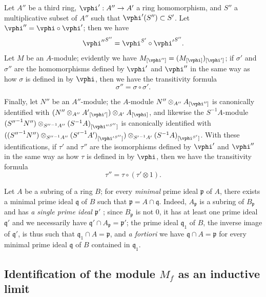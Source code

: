 \begin{env}[1.5.7]
\label{0.1.5.7}
Let $A''$ be a third ring, $\vphi':A''\to A'$ a ring homomorphism, and $S''$ a multiplicative subset of $A''$ such that $\vphi'(S'')\subset S'$.
Let $\vphi''=\vphi\circ\vphi'$; then we have
\[
  {\vphi''}^{S''}=\vphi^{S'}\circ{\vphi'}^{S''}.
\]
Let $M$ be an $A$-module; evidently we have $M_{[\vphi'']}=(M_{[\vphi]})_{[\vphi']}$; if $\sigma'$ and $\sigma''$ are the homomorphisms defined by $\vphi'$ and $\vphi''$ in the same way as how $\sigma$ is defined in  by $\vphi$, then we have the transitivity formula
\[
  \sigma''=\sigma\circ\sigma'.
\]

Finally, let $N''$ be an $A''$-module; the $A$-module $N''\otimes_{A''}A_{[\vphi'']}$ is canonically identified with $(N''\otimes_{A''}{A'}_{[\vphi']})\otimes_{A'}A_{[\vphi]}$, and likewise the $S^{-1}A$-module $({S''}^{-1}N'')\otimes_{{S''}^{-1}A''}(S^{-1}A)_{[{\vphi''}^{S''}]}$ is canonically identified with $(({S''}^{-1}N'')\otimes_{{S''}^{-1}A''}({S'}^{-1}A')_{[{\vphi'}^{S''}]})
  \otimes_{{S'}^{-1}A'}(S^{-1}A)_{[\vphi^{S'}]}$.
With these identifications, if $\tau'$ and $\tau''$ are the isomorphisms defined by $\vphi'$ and $\vphi''$ in the same way as how $\tau$ is defined in  by $\vphi$, then we have the transitivity formula
\[
  \tau''=\tau\circ(\tau'\otimes 1).
\]
\end{env}

\begin{env}[1.5.8]
\label{0.1.5.8}
Let $A$ be a subring of a ring $B$; for every \emph{minimal} prime ideal $\mathfrak{p}$ of $A$, there exists a minimal prime ideal $\mathfrak{q}$ of $B$ such that $\mathfrak{p}=A\cap\mathfrak{q}$.
Indeed, $A_\mathfrak{p}$ is a subring of $B_\mathfrak{p}$  and has \emph{a single prime ideal $\mathfrak{p}'$} ; since $B_\mathfrak{p}$ is not $0$, it has at least one prime ideal $\mathfrak{q}'$ and we necessarily have $\mathfrak{q}'\cap A_\mathfrak{p}=\mathfrak{p}'$; the prime ideal $\mathfrak{q}_1$ of $B$, the inverse image of $\mathfrak{q}'$, is thus such that $\mathfrak{q}_1\cap A=\mathfrak{p}$, and \emph{a fortiori} we have $\mathfrak{q}\cap A=\mathfrak{p}$ for every minimal prime ideal $\mathfrak{q}$ of $B$ contained in $\mathfrak{q}_1$.
\end{env}

\subsection{Identification of the module $M_f$ as an inductive limit}
\label{subsection:0.1.6}


